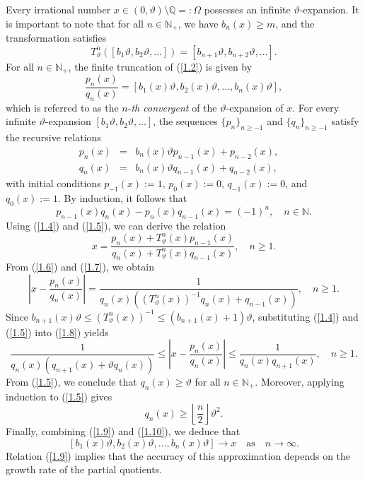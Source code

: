 \documentclass[final,1p,times]{elsarticle}
\numberwithin{equation}{section}
\begin{document}
Every irrational number $x \in (0, \vartheta) \setminus \mathbb{Q}=: \Omega$ possesses an infinite $\vartheta$-expansion. It is important to note that for all $n \in \mathbb{N}_+$, we have $b_n(x) \geq m$, and the transformation satisfies  
\[
T^n_{\vartheta}([b_1 \vartheta, b_2 \vartheta, \ldots]) = [b_{n+1} \vartheta, b_{n+2} \vartheta, \ldots].
\]
For all $n \in \mathbb{N}_+$, the finite truncation of (\ref{1.2}) is given by  
\[
\frac{p_n(x)}{q_n(x)} = [b_1(x) \vartheta, b_2(x) \vartheta, \ldots, b_n(x) \vartheta],
\]
which is referred to as the $n$-\textit{th convergent} of the $\vartheta$-expansion of $x$.  
For every infinite $\vartheta$-expansion $[b_1 \vartheta, b_2 \vartheta, \ldots]$, the sequences $\{p_n\}_{n \geq -1}$ and $\{q_n\}_{n \geq -1}$ satisfy the recursive relations  
%
\begin{eqnarray}
p_n(x) &=& b_n(x) \vartheta p_{n-1}(x) + p_{n-2}(x), \quad \label{1.4} \\
q_n(x) &=& b_n(x) \vartheta q_{n-1}(x) + q_{n-2}(x), \quad \label{1.5}
\end{eqnarray}
%
with initial conditions $p_{-1}(x) := 1$, $p_0(x) := 0$, $q_{-1}(x) := 0$, and $q_{0}(x) := 1$.  
By induction, it follows that  
%
\begin{equation}
p_{n-1}(x)q_{n}(x) - p_{n}(x)q_{n-1}(x) = (-1)^{n}, \quad n \in \mathbb{N}. \label{1.6}
\end{equation}
Using (\ref{1.4}) and (\ref{1.5}), we can derive the relation  
%
\begin{equation}
x = \frac{p_n(x) + T^n_{\vartheta}(x)p_{n-1}(x)}
{q_n(x) + T^n_{\vartheta}(x)q_{n-1}(x)}, \quad n \geq 1. \label{1.7}
\end{equation}
%
From (\ref{1.6}) and (\ref{1.7}), we obtain  
%
\begin{equation}
\left| x - \frac{p_n(x)}{q_n(x)} \right|  = \frac{1}{q_n(x)\left(\left(T^n_{\vartheta}(x)\right)^{-1} q_n(x)+q_{n-1}(x) \right)}, \quad n \geq 1. \label{1.8}
\end{equation}
%
Since $b_{n+1}(x)\vartheta \leq \left(T^n_{\vartheta}(x)\right)^{-1} \leq (b_{n+1}(x)+1)\vartheta$, substituting (\ref{1.4}) and (\ref{1.5}) into (\ref{1.8}) yields  
%
\begin{equation}
\frac{1}{q_n(x)(q_{n+1}(x)+\vartheta q_{n}(x))} \leq  \left| x - \frac{p_n(x)}{q_n(x)} \right| \leq \frac{1}{q_n(x)q_{n+1}(x)}, \quad n \geq 1. \label{1.9}
\end{equation}
%
From (\ref{1.5}), we conclude that $q_n(x) \geq \vartheta$ for all $n \in \mathbb{N}_+$. Moreover, applying induction to (\ref{1.5}) gives  
%
\begin{equation}
q_n(x) \geq  \left\lfloor \frac{n}{2} \right \rfloor \vartheta^2. \label{1.10} 
\end{equation}
%
Finally, combining (\ref{1.9}) and (\ref{1.10}), we deduce that  
\[
[b_1(x) \vartheta, b_2(x) \vartheta, \ldots, b_n(x) \vartheta] \to x \quad \text{as} \quad n \to \infty.
\]
Relation (\ref{1.9}) implies that the accuracy of this approximation depends on the growth rate of the partial quotients.  
\end{document}
